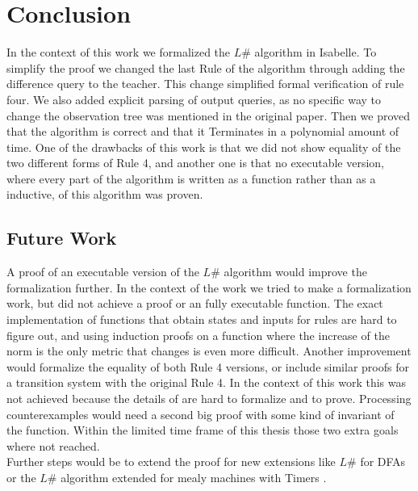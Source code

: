 \chapter{Conclusion}
In the context of this work we formalized the $L\#$ algorithm in Isabelle. To simplify the proof we changed the last Rule of the algorithm through adding the difference query to the teacher. This change simplified formal verification of rule four. We also added explicit parsing of output queries, as no specific way to change the observation tree was mentioned in the original paper. Then we proved that the algorithm is correct and that it Terminates in a polynomial amount of time. One of the drawbacks of this work is that we did not show equality of the two different forms of Rule 4, and another one is that no executable version, where every part of the algorithm is written as a function rather than as a inductive, of this algorithm was proven.
\section{Future Work}
A proof of an executable version of the $L\#$ algorithm would improve the formalization further. In the context of the work we tried to make a formalization work, but did not achieve a proof or an fully executable function. The exact implementation of functions that obtain states and inputs for rules are hard to figure out, and using induction proofs on a function where the increase of the norm is the only metric that changes is even more difficult. Another improvement would formalize the equality of both Rule 4 versions, or include similar proofs for a transition system with the original Rule 4. In the context of this work this was not achieved because the details of \proccon\space are hard to formalize and to prove. Processing counterexamples would need a second big proof with some kind of invariant of the function. Within the limited time frame of this thesis those two extra goals where not reached. \\
Further steps would be to extend the proof for new extensions like $L\#$ for DFAs \cite{DBLP:conf/birthday/VaandragerS25} or the $L\#$ algorithm extended for mealy machines with Timers \cite{DBLP:journals/corr/abs-2403-02019}.
 
